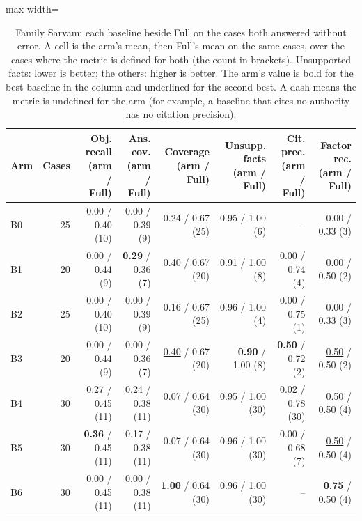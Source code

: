 \begin{table}[t]
\centering\footnotesize
\begin{adjustbox}{max width=\textwidth}
\begin{tabular}{@{}lrrrrrrr@{}}
\toprule
Arm & Cases & Obj. recall (arm / Full) & Ans. cov. (arm / Full) & Coverage (arm / Full) & Unsupp. facts (arm / Full) & Cit. prec. (arm / Full) & Factor rec. (arm / Full) \\
\midrule
B0 & 25 & 0.00 / 0.40 (10) & 0.00 / 0.39 (9) & 0.24 / 0.67 (25) & 0.95 / 1.00 (6) & -- & 0.00 / 0.33 (3) \\
B1 & 20 & 0.00 / 0.44 (9) & \textbf{0.29} / 0.36 (7) & \underline{0.40} / 0.67 (20) & \underline{0.91} / 1.00 (8) & 0.00 / 0.74 (4) & 0.00 / 0.50 (2) \\
B2 & 25 & 0.00 / 0.40 (10) & 0.00 / 0.39 (9) & 0.16 / 0.67 (25) & 0.96 / 1.00 (4) & 0.00 / 0.75 (1) & 0.00 / 0.33 (3) \\
B3 & 20 & 0.00 / 0.44 (9) & 0.00 / 0.36 (7) & \underline{0.40} / 0.67 (20) & \textbf{0.90} / 1.00 (8) & \textbf{0.50} / 0.72 (2) & \underline{0.50} / 0.50 (2) \\
B4 & 30 & \underline{0.27} / 0.45 (11) & \underline{0.24} / 0.38 (11) & 0.07 / 0.64 (30) & 0.95 / 1.00 (30) & \underline{0.02} / 0.78 (30) & \underline{0.50} / 0.50 (4) \\
B5 & 30 & \textbf{0.36} / 0.45 (11) & 0.17 / 0.38 (11) & 0.07 / 0.64 (30) & 0.96 / 1.00 (30) & 0.00 / 0.68 (7) & \underline{0.50} / 0.50 (4) \\
B6 & 30 & 0.00 / 0.45 (11) & 0.00 / 0.38 (11) & \textbf{1.00} / 0.64 (30) & 0.96 / 1.00 (30) & -- & \textbf{0.75} / 0.50 (4) \\
\bottomrule
\end{tabular}
\end{adjustbox}
\caption{Family Sarvam: each baseline beside Full on the cases both answered without error. A cell is the arm's mean, then Full's mean on the same cases, over the cases where the metric is defined for both (the count in brackets). Unsupported facts: lower is better; the others: higher is better. The arm's value is bold for the best baseline in the column and underlined for the second best. A dash means the metric is undefined for the arm (for example, a baseline that cites no authority has no citation precision).}
\label{tab:main_sarvam}
\end{table}